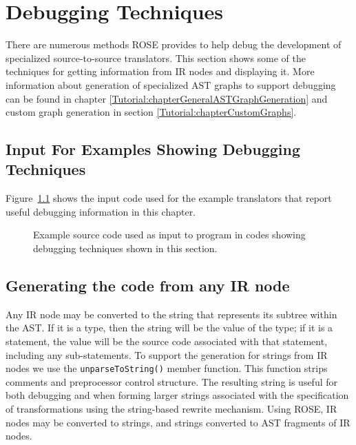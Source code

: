 \chapter{Debugging Techniques}
     There are numerous methods ROSE provides to help debug the 
development of specialized source-to-source translators.
This section shows some of the techniques for getting
information from IR nodes and displaying it.  
More information about generation of specialized AST graphs to support debugging 
can be found in chapter \ref{Tutorial:chapterGeneralASTGraphGeneration} and custom 
graph generation in section \ref{Tutorial:chapterCustomGraphs}.

\section{Input For Examples Showing Debugging Techniques}

   Figure~\ref{Tutorial:exampleInputCode_ExampleDebugging}
shows the input code used for the example translators that
report useful debugging information in this chapter.

\begin{figure}[!h]
{\indent
{\mySmallFontSize

\begin{latexonly}
   
\end{latexonly}

\begin{htmlonly}
   
\end{htmlonly}

}
}
\caption{Example source code used as input to program in
         codes showing debugging techniques shown in this section.}
\label{Tutorial:exampleInputCode_ExampleDebugging}
\end{figure}


\section{Generating the code from any IR node}

     Any IR node may be converted to the string that represents
its subtree within the AST.  If it is a type, then the string will be 
the value of the type; if it is a statement, the value will be the 
source code associated with that statement, including any sub-statements.
To support the generation for strings from IR nodes we use the
{\tt unparseToString()} member function.  This function strips
comments and preprocessor control structure.  The resulting string is useful
for both debugging and when forming larger strings associated with the
specification of transformations using the string-based rewrite mechanism.
Using ROSE, IR nodes may be converted to strings, and strings converted to 
AST fragments of IR nodes.

